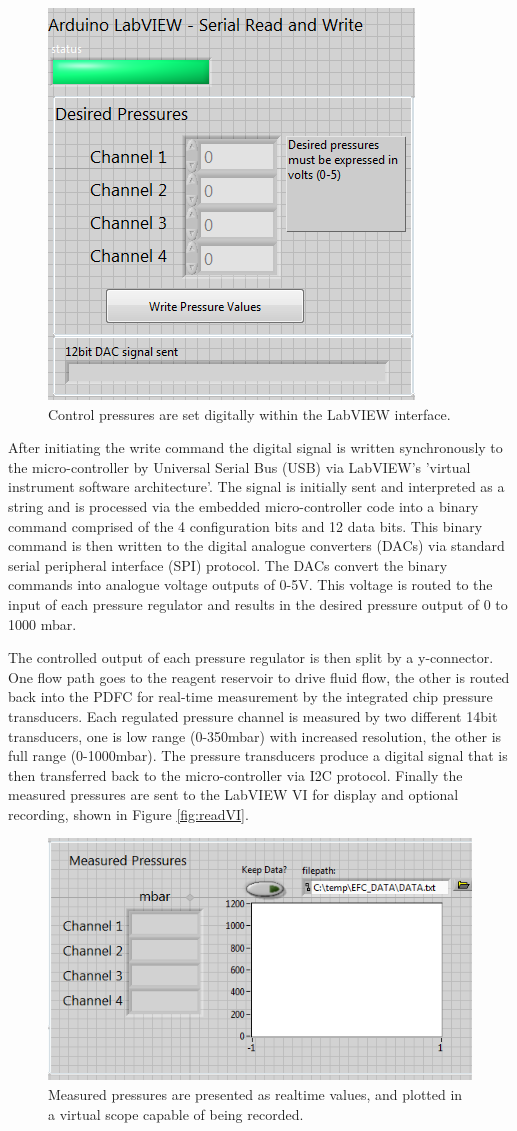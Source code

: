 \begin{figure}[H]
\centering 
\includegraphics[width=0.5\columnwidth]{writeVI.PNG} 
\caption[LabVIEW write command]{Control pressures are set digitally within the LabVIEW interface.} 
\label{fig:writeVI} 
\end{figure}

After initiating the write command the digital signal is written synchronously to the micro-controller by Universal Serial Bus (USB) via LabVIEW's 'virtual instrument software architecture'. The signal is initially sent and interpreted as a string and is processed via the embedded micro-controller code into a binary command comprised of the 4 configuration bits and 12 data bits. This binary command is then written to the digital analogue converters (DACs) via standard serial peripheral  interface (SPI) protocol. The DACs convert the binary commands into analogue voltage outputs of 0-5V. This voltage is routed to the input of each pressure regulator and results in the desired pressure output of 0 to 1000 mbar.

The controlled output of each pressure regulator is then split by a y-connector. One flow path goes to the reagent reservoir to drive fluid flow, the other is routed back into the PDFC for real-time measurement by the integrated chip pressure transducers. Each regulated pressure channel is measured by two different 14bit transducers, one is low range (0-350mbar) with increased resolution, the other is full range (0-1000mbar). The pressure transducers produce a digital signal that is then transferred back to the micro-controller via I2C protocol. Finally the measured pressures are sent to the LabVIEW VI for display and optional recording, shown in Figure \vref{fig:readVI}. 

\begin{figure}[H]
\centering 
\includegraphics[width=0.65\columnwidth]{readVI.PNG} 
\caption[LabVIEW measured pressures]{Measured pressures are presented as realtime values, and plotted in a virtual scope capable of being recorded.} 
\label{fig:readVI} 
\end{figure}

